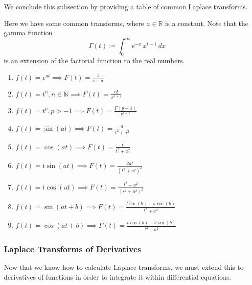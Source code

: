 \documentclass{article}
\newcounter{theorem}[section]
\begin{document}
    We conclude this subsection by providing a table of common Laplace transforms. 

    \begin{theorem}
      \label{thm:table-of-common-laplace-transforms}
    Here we have some common transforms, where $a \in \mathbb{R}$ is a constant. Note that the \hyperref[def:gamma-function]{gamma function}
    \begin{equation}
      \Gamma(t) \coloneqq \int_{0}^\infty e^{-x} \, x^{t-1}\,dx
    \end{equation}
    is an extension of the factorial function to the real numbers. 
    \begin{enumerate}
        \item $f(t) = e^{a t} \implies F(t) = \frac{1}{s-a}$
        \item $f(t) = t^n, n \in \mathbb{N} \implies F(t) = \frac{n!}{s^{n+1}}$
        \item $f(t) = t^p, p > -1 \implies F(t) = \frac{\Gamma(p+1)}{t^{p+1}}$
        \item $f(t) = \sin(at) \implies F(t) = \frac{a}{t^2 + a^2}$
        \item $f(t) = \cos(at) \implies F(t) = \frac{t}{t^2 + a^2}$ 
        \item $f(t) = t \sin(at) \implies F(t) = \frac{2 a t}{(t^2 + a^2)^2}$
        \item $f(t) = t \cos(at) \implies F(t) = \frac{t^2 - a^2}{(s^2 + a^2)^2}$
        \item $f(t) = \sin(a t + b) \implies F(t) = \frac{t \sin(b) + a \cos(b)}{t^2 + a^2}$
        \item $f(t) = \cos(a t + b) \implies F(t) = \frac{t \cos(b) - a \sin(b)}{t^2 + a^2}$
    \end{enumerate}
    \end{theorem}

    \subsubsection{Laplace Transforms of Derivatives}

      Now that we know how to calculate Laplace transforms, we must extend this to derivatives of functions in order to integrate it within differential equations. 
\end{document}
